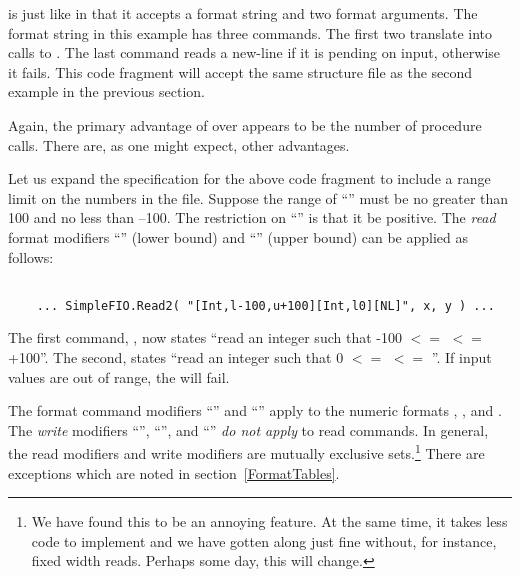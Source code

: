  is just like  in
that it accepts a format string and two format arguments.  The
format string in this example has three commands.  The first
two translate into calls to .  The last command
reads a new-line if it is pending on input, otherwise it fails.
This code fragment will accept the same structure file as the
second example in the previous section.  

\newpage
{}

    
Again, the primary advantage of  over 
appears to be the number of procedure calls.  There are, as one might
expect, other advantages.

Let us expand the specification for the above code fragment to
include a range limit on the numbers in the file.  Suppose the
range of ``'' must be no greater than 100 and no less than --100.
The restriction on ``'' is that it be positive.  The {\em read}
format modifiers ``'' (lower bound) and ``'' (upper bound)
can be applied as follows:
\begin{verbatim}

    ... SimpleFIO.Read2( "[Int,l-100,u+100][Int,l0][NL]", x, y ) ...

\end{verbatim}
The first command, \code{[Int,l-100,u+100]}, now states ``read an integer such 
that -100 $<=$  $<=$ +100''.  The second, \code{[Int,l0]} states 
``read an integer
such that 0 $<=$  $<=$ ''.  If input
values are out of range, the  will fail.  

The format command modifiers ``'' and ``'' 
apply to the numeric formats , , and .
The {\em write} modifiers ``'', ``'', and
``'' {\em do not apply} to read commands.  In general, the
read modifiers and write modifiers are mutually exclusive sets.\footnote{
    We have found this to be an annoying feature.  At the same time,
    it takes less code to implement and we have gotten along just
    fine without, for instance, fixed width reads.  Perhaps some
    day, this will change.}
There are exceptions which are noted in section~\ref{FormatTables}.

